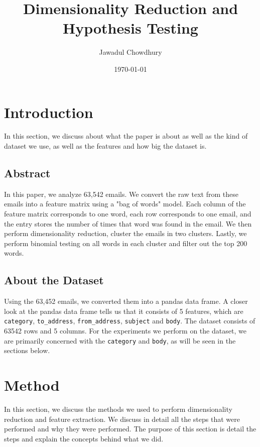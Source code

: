 \documentclass[a4paper, twocolumn]{article}
\title{Dimensionality Reduction and Hypothesis Testing}
\author{Jawadul Chowdhury}
\date{\today}
\begin{document}
\setlength{\intextsep}{0pt} 
\setlength{\textfloatsep}{5pt} 

\maketitle
\onecolumn

\tableofcontents
\newpage

\twocolumn


\section{Introduction}
In this section, we discuss about what the paper is about as well as the kind of dataset we use, as well as the features and how big the dataset is.

\subsection{Abstract}
In this paper, we analyze 63,542 emails. We convert the raw text from these emails into a feature matrix using a  "bag of words" model. Each column of the 
feature matrix corresponds to one word, each row corresponds to one email,  and the entry stores the number of times that word was found in the email. We 
then perform dimensionality reduction, cluster the emails in two clusters. Lastly, we perform binomial testing on all words in each cluster and filter
out the top 200 words.

\subsection{About the Dataset}
Using the 63,452 emails, we converted them into a pandas data frame. A closer look at the pandas data frame tells us that it consists of 5 
features, which are \texttt{category}, \texttt{to\_address}, \texttt{from\_address}, \texttt{subject} and \texttt{body}. The dataset consists of 63542 rows
and 5 columns. For the experiments we perform on the dataset, we are primarily concerned with the \texttt{category} and \texttt{body}, as will be seen in the
sections below.

\section{Method}
In this section, we discuss the methods we used to perform dimensionality reduction and feature extraction. We discuss in detail all the steps that were 
performed and why they were performed. The purpose of this section is detail the steps and explain the concepts behind what we did.
\end{document}
